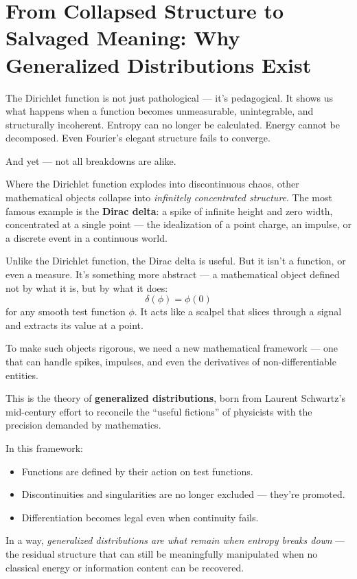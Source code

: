 \section{From Collapsed Structure to Salvaged Meaning: Why Generalized Distributions Exist}

The Dirichlet function is not just pathological — it's pedagogical. It shows us what happens when a function becomes unmeasurable, unintegrable, and structurally incoherent. Entropy can no longer be calculated. Energy cannot be decomposed. Even Fourier’s elegant structure fails to converge.

And yet — not all breakdowns are alike.

Where the Dirichlet function explodes into discontinuous chaos, other mathematical objects collapse into \emph{infinitely concentrated structure}. The most famous example is the \textbf{Dirac delta}: a spike of infinite height and zero width, concentrated at a single point — the idealization of a point charge, an impulse, or a discrete event in a continuous world.

Unlike the Dirichlet function, the Dirac delta is useful. But it isn’t a function, or even a measure. It’s something more abstract — a mathematical object defined not by what it is, but by what it does:
\[
\delta(\phi) = \phi(0)
\]
for any smooth test function \( \phi \). It acts like a scalpel that slices through a signal and extracts its value at a point.

To make such objects rigorous, we need a new mathematical framework — one that can handle spikes, impulses, and even the derivatives of non-differentiable entities.

This is the theory of \textbf{generalized distributions}, born from Laurent Schwartz’s mid-century effort to reconcile the “useful fictions” of physicists with the precision demanded by mathematics.

In this framework:
\begin{itemize}
    \item Functions are defined by their action on test functions.
    \item Discontinuities and singularities are no longer excluded — they’re promoted.
    \item Differentiation becomes legal even when continuity fails.
\end{itemize}

In a way, \emph{generalized distributions are what remain when entropy breaks down} — the residual structure that can still be meaningfully manipulated when no classical energy or information content can be recovered.

